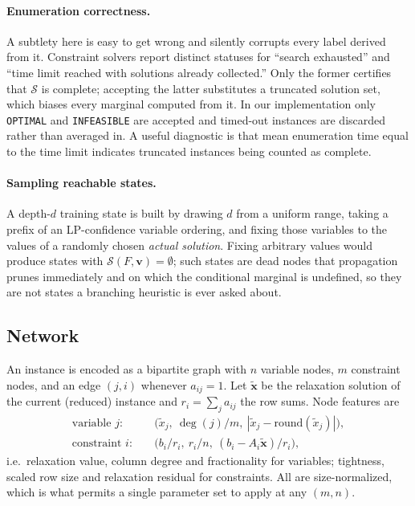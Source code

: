 \documentclass[11pt]{article}
\newcommand{\SOL}{\mathcal{S}}
\begin{document}
\paragraph{Enumeration correctness.} A subtlety here is easy to get wrong and silently corrupts every label derived from it. Constraint solvers report distinct statuses for ``search exhausted'' and ``time limit reached with solutions already collected.'' Only the former certifies that $\SOL$ is complete; accepting the latter substitutes a truncated solution set, which biases every marginal computed from it. In our implementation only \texttt{OPTIMAL} and \texttt{INFEASIBLE} are accepted and timed-out instances are discarded rather than averaged in. A useful diagnostic is that mean enumeration time equal to the time limit indicates truncated instances being counted as complete.

\paragraph{Sampling reachable states.} A depth-$d$ training state is built by drawing $d$ from a uniform range, taking a prefix of an LP-confidence variable ordering, and fixing those variables to the values of a randomly chosen \emph{actual solution}. Fixing arbitrary values would produce states with $\SOL(F,\mathbf{v})=\emptyset$; such states are dead nodes that propagation prunes immediately and on which the conditional marginal is undefined, so they are not states a branching heuristic is ever asked about.

\subsection{Network}
\label{sec:method-net}

An instance is encoded as a bipartite graph with $n$ variable nodes, $m$ constraint nodes, and an edge $(j,i)$ whenever $a_{ij}=1$. Let $\tilde{\mathbf{x}}$ be the relaxation solution of the current (reduced) instance and $r_i = \sum_j a_{ij}$ the row sums. Node features are
\begin{align}
\text{variable } j:&\quad \big(\tilde{x}_j,\ \deg(j)/m,\ |\tilde{x}_j - \mathrm{round}(\tilde{x}_j)|\big),\\
\text{constraint } i:&\quad \big(b_i/r_i,\ r_i/n,\ (b_i - A_i\tilde{\mathbf{x}})/r_i\big),
\end{align}
i.e.\ relaxation value, column degree and fractionality for variables; tightness, scaled row size and relaxation residual for constraints. All are size-normalized, which is what permits a single parameter set to apply at any $(m,n)$.
\end{document}
